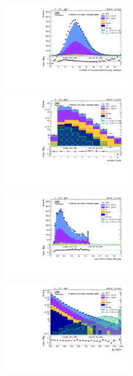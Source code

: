 \begin{figure}[!htb]
  \begin{center}  
    \includegraphics[width=0.495\textwidth]{plots/v9_U/XVZnnlpSB/nPV.pdf}
    \includegraphics[width=0.495\textwidth]{plots/v9_U/XVZnnlpSB/nJets.pdf}

    \includegraphics[width=0.495\textwidth]{plots/v9_U/XVZnnlpSB/MaxJetBTag.pdf}
    \includegraphics[width=0.495\textwidth]{plots/v9_U/XVZnnlpSB/MEt_pt.pdf}


\end{center}
\end{figure}
